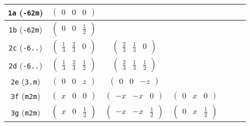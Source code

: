 \documentclass[fleqn,9pt,landscape]{jsarticle}
\begin{document}
\begin{center}
\begin{longtable}{ccccccc}
{\tt 1a} ({\tt -62m}) & $ \begin{pmatrix} 0 & 0 & 0 \end{pmatrix} $ & $  $ & $  $ & $  $ & $  $ & $  $ \\ \hline
{\tt 1b} ({\tt -62m}) & $ \begin{pmatrix} 0 & 0 & \frac{1}{2} \end{pmatrix} $ & $  $ & $  $ & $  $ & $  $ & $  $ \\ \hline
{\tt 2c} ({\tt -6..}) & $ \begin{pmatrix} \frac{1}{3} & \frac{2}{3} & 0 \end{pmatrix} $ & $ \begin{pmatrix} \frac{2}{3} & \frac{1}{3} & 0 \end{pmatrix} $ & $  $ & $  $ & $  $ & $  $ \\ \hline
{\tt 2d} ({\tt -6..}) & $ \begin{pmatrix} \frac{1}{3} & \frac{2}{3} & \frac{1}{2} \end{pmatrix} $ & $ \begin{pmatrix} \frac{2}{3} & \frac{1}{3} & \frac{1}{2} \end{pmatrix} $ & $  $ & $  $ & $  $ & $  $ \\ \hline
{\tt 2e} ({\tt 3.m}) & $ \begin{pmatrix} 0 & 0 & z \end{pmatrix} $ & $ \begin{pmatrix} 0 & 0 & - z \end{pmatrix} $ & $  $ & $  $ & $  $ & $  $ \\ \hline
{\tt 3f} ({\tt m2m}) & $ \begin{pmatrix} x & 0 & 0 \end{pmatrix} $ & $ \begin{pmatrix} - x & - x & 0 \end{pmatrix} $ & $ \begin{pmatrix} 0 & x & 0 \end{pmatrix} $ & $  $ & $  $ & $  $ \\ \hline
{\tt 3g} ({\tt m2m}) & $ \begin{pmatrix} x & 0 & \frac{1}{2} \end{pmatrix} $ & $ \begin{pmatrix} - x & - x & \frac{1}{2} \end{pmatrix} $ & $ \begin{pmatrix} 0 & x & \frac{1}{2} \end{pmatrix} $ & $  $ & $  $ & $  $ \\ \hline

\end{longtable}
\end{center}
\end{document}
